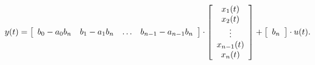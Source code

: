 \begin{equation*}
y(t) = 
\left [ 
\begin{array}{c c c c}
b_0-a_0b_n & b_1-a_1b_n & \ldots & b_{n-1}-a_{n-1}b_n\\
\end{array}
\right ] \cdot
\left [ 
\begin{array}{c}
x_1(t)\\
x_2(t)\\
\vdots \\
x_{n-1}(t)\\
x_{n}(t)\\
\end{array}
\right ]+
\left [ 
\begin{array}{c}
b_n \\
\end{array}
\right ] \cdot
u(t).
\end{equation*}
\normalsize


